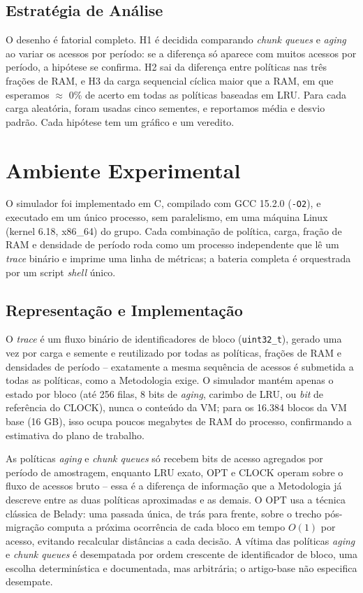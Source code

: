 \documentclass[12pt]{article}
\begin{document}
\subsection{Estratégia de Análise}

O desenho é fatorial completo. H1 é decidida comparando \textit{chunk queues} e \textit{aging} ao variar os acessos por período: se a diferença só aparece com muitos acessos por período, a hipótese se confirma. H2 sai da diferença entre políticas nas três frações de RAM, e H3 da carga sequencial cíclica maior que a RAM, em que esperamos $\approx$ 0\% de acerto em todas as políticas baseadas em LRU. Para cada carga aleatória, foram usadas cinco sementes, e reportamos média e desvio padrão. Cada hipótese tem um gráfico e um veredito.

\section{Ambiente Experimental}

O simulador foi implementado em C, compilado com GCC 15.2.0 (\texttt{-O2}), e executado em um único processo, sem paralelismo, em uma máquina Linux (kernel 6.18, x86\_64) do grupo. Cada combinação de política, carga, fração de RAM e densidade de período roda como um processo independente que lê um \textit{trace} binário e imprime uma linha de métricas; a bateria completa é orquestrada por um script \textit{shell} único.

\subsection{Representação e Implementação}

O \textit{trace} é um fluxo binário de identificadores de bloco (\texttt{uint32\_t}), gerado uma vez por carga e semente e reutilizado por todas as políticas, frações de RAM e densidades de período -- exatamente a mesma sequência de acessos é submetida a todas as políticas, como a Metodologia exige. O simulador mantém apenas o estado por bloco (até 256 filas, 8 bits de \textit{aging}, carimbo de LRU, ou \textit{bit} de referência do CLOCK), nunca o conteúdo da VM; para os 16.384 blocos da VM base (16 GB), isso ocupa poucos megabytes de RAM do processo, confirmando a estimativa do plano de trabalho.

As políticas \textit{aging} e \textit{chunk queues} só recebem bits de acesso agregados por período de amostragem, enquanto LRU exato, OPT e CLOCK operam sobre o fluxo de acessos bruto -- essa é a diferença de informação que a Metodologia já descreve entre as duas políticas aproximadas e as demais. O OPT usa a técnica clássica de Belady: uma passada única, de trás para frente, sobre o trecho pós-migração computa a próxima ocorrência de cada bloco em tempo $O(1)$ por acesso, evitando recalcular distâncias a cada decisão. A vítima das políticas \textit{aging} e \textit{chunk queues} é desempatada por ordem crescente de identificador de bloco, uma escolha determinística e documentada, mas arbitrária; o artigo-base não especifica desempate.
\end{document}
